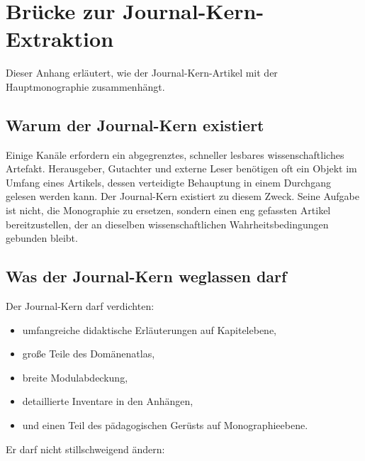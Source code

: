 \section{Brücke zur Journal-Kern-Extraktion}

Dieser Anhang erläutert, wie der Journal-Kern-Artikel mit der Hauptmonographie zusammenhängt.

\subsection{Warum der Journal-Kern existiert}

Einige Kanäle erfordern ein abgegrenztes, schneller lesbares wissenschaftliches Artefakt.
Herausgeber, Gutachter und externe Leser benötigen oft ein Objekt im Umfang eines Artikels, dessen verteidigte Behauptung
in einem Durchgang gelesen werden kann.
Der Journal-Kern existiert zu diesem Zweck.
Seine Aufgabe ist nicht, die Monographie zu ersetzen, sondern einen eng gefassten Artikel bereitzustellen, der an
dieselben wissenschaftlichen Wahrheitsbedingungen gebunden bleibt.

\subsection{Was der Journal-Kern weglassen darf}

Der Journal-Kern darf verdichten:

\begin{itemize}
\item umfangreiche didaktische Erläuterungen auf Kapitelebene,
\item große Teile des Domänenatlas,
\item breite Modulabdeckung,
\item detaillierte Inventare in den Anhängen,
\item und einen Teil des pädagogischen Gerüsts auf Monographieebene.
\end{itemize}

Er darf nicht stillschweigend ändern:

